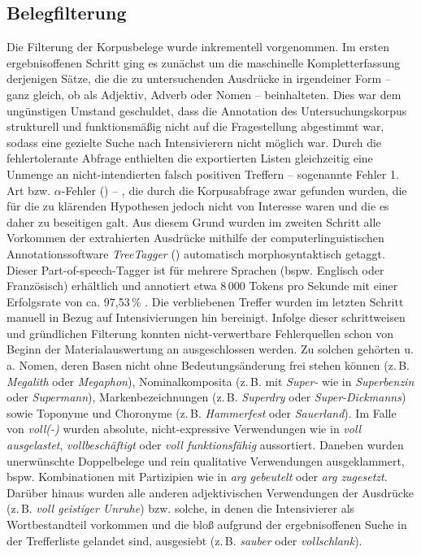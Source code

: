 \subsection{Belegfilterung}
\largerpage
Die Filterung der Korpusbelege wurde inkrementell vorgenommen. Im ersten ergebnisoffenen Schritt ging es zunächst um die maschinelle Kompletterfassung derjenigen Sätze, die die zu untersuchenden Ausdrücke in irgendeiner Form -- ganz gleich, ob als Adjektiv, Adverb oder Nomen -- beinhalteten. Dies war dem ungünstigen Umstand geschuldet, dass die Annotation des Untersuchungskorpus strukturell und funktionsmäßig nicht auf die Fragestellung abgestimmt war, sodass eine gezielte Suche nach Intensivierern nicht möglich war. Durch die fehlertolerante Abfrage enthielten die exportierten Listen gleichzeitig eine Unmenge an nicht-intendierten falsch positiven Treffern -- sogenannte \glqq{}Fehler 1. Art\grqq{} bzw. \glqq{}$\alpha$-Fehler\grqq{} (\citealt[62]{Perkuhn.2012}) -- , die durch die Korpusabfrage zwar gefunden wurden, die für die zu klärenden Hypothesen jedoch nicht von Interesse waren und die es daher zu beseitigen galt. Aus diesem Grund wurden im zweiten Schritt alle Vorkommen der extrahierten Ausdrücke mithilfe der computerlinguistischen Annotationssoftware \textit{TreeTagger} (\citealt[]{Schmid.1994,Schmid.1995}) automatisch morphosyntaktisch getaggt. Dieser Part-of-speech-Tagger ist für mehrere Sprachen (bspw. Englisch oder Französisch) erhältlich und annotiert etwa 8\,000 Tokens pro Sekunde mit einer Erfolgsrate von ca. 97,53\,\% \citep[vgl.][22f.]{Schmid.1995}. Die verbliebenen Treffer wurden im letzten Schritt manuell in Bezug auf Intensivierungen hin bereinigt. Infolge dieser schrittweisen und gründlichen Filterung konnten nicht-verwertbare Fehlerquellen schon von Beginn der Materialauswertung an ausgeschlossen werden. Zu solchen gehörten u.\,a. Nomen, deren Basen nicht ohne Bedeutungsänderung frei stehen können (z.\,B. \textit{Megalith} oder \textit{Megaphon}), Nominalkomposita (z.\,B. mit \textit{Super-} wie in \textit{Superbenzin} oder \textit{Supermann}), Markenbezeichnungen (z.\,B. \textit{Superdry} oder \textit{Super-Dickmanns}) sowie Toponyme und Choronyme (z.\,B. \textit{Hammerfest} oder \textit{Sauerland}). Im Falle von \textit{voll(-)} wurden absolute, nicht-expressive Verwendungen wie in \textit{voll ausgelastet}, \textit{vollbeschäftigt} oder \textit{voll funktionsfähig} aussortiert. Daneben wurden unerwünschte Doppelbelege und rein qualitative Verwendungen ausgeklammert, bspw. Kombinationen mit Partizipien wie in \textit{arg gebeutelt} oder \textit{arg zugesetzt}. Darüber hinaus wurden alle anderen adjektivischen Verwendungen der Ausdrücke (z.\,B. \textit{voll geistiger Unruhe}) bzw. solche, in denen die Intensivierer als Wortbestandteil vorkommen und die bloß aufgrund der ergebnisoffenen Suche in der Trefferliste gelandet sind, ausgesiebt (z.\,B. \textit{sauber} oder \textit{vollschlank}).

